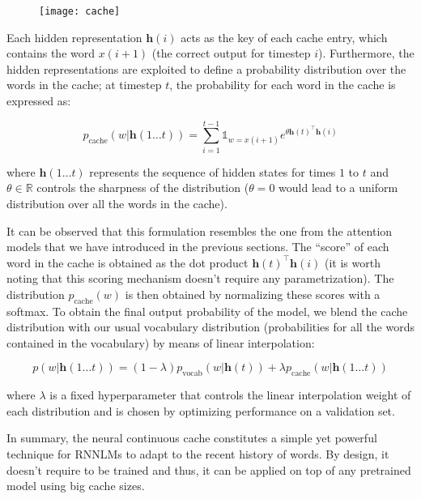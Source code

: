 \begin{figure}[H]
	\centering
	\texttt{[image: cache]}
	\label{fig:cache}
\end{figure}

Each hidden representation $\mathbf{h}(i)$ acts as the key of each cache entry, which contains the word $x(i+1)$ (the correct output for timestep $i$). Furthermore, the hidden representations are exploited to define a probability distribution over the words in the cache; at timestep $t$, the probability for each word in the cache is expressed as:

\begin{equation} \label{eq:cacheProb}
	p_{\text{cache}}(w|\mathbf{h}(1\ldots t)) = \sum_{i=1}^{t-1} \mathbb{1}_{w=x(i+1)} e^{\theta\mathbf{h}(t)^{\top}\mathbf{h}(i)}
\end{equation}

where $\mathbf{h}(1\ldots t)$ represents the sequence of hidden states for times $1$ to $t$ and $\theta \in \mathbb{R}$ controls the sharpness of the distribution ($\theta=0$ would lead to a uniform distribution over all the words in the cache).

It can be observed that this formulation resembles the one from the attention models that we have introduced in the previous sections. The ``score'' of each word in the cache is obtained as the dot product $\mathbf{h}(t)^{\top}\mathbf{h}(i)$ (it is worth noting that this scoring mechanism doesn't require any parametrization). The distribution $p_{\text{cache}}(w)$ is then obtained by normalizing these scores with a softmax. To obtain the final output probability of the model, we blend the cache distribution with our usual vocabulary distribution (probabilities for all the words contained in the vocabulary) by means of linear interpolation:

\begin{equation} \label{eq:contCache}
	p(w|\mathbf{h}(1\ldots t)) = (1-\lambda)p_{\text{vocab}}(w|\mathbf{h}(t)) + \lambda p_{\text{cache}}(w|\mathbf{h}(1\ldots t))
\end{equation}

where $\lambda$ is a fixed hyperparameter that controls the linear interpolation weight of each distribution and is chosen by optimizing performance on a validation set. 

In summary, the neural continuous cache constitutes a simple yet powerful technique for RNNLMs to adapt to the recent history of words. By design, it doesn't require to be trained and thus, it can be applied on top of any pretrained model using big cache sizes.

